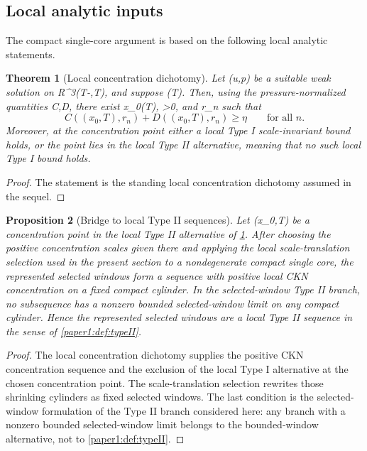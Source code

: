 \documentclass[11pt]{amsart}
\def\({}%
\def\){}%
\def\mathbb#1{#1}%
\theoremstyle{plain}
\newtheorem{theorem}{Theorem}[section]
\newtheorem{proposition}[theorem]{Proposition}
\theoremstyle{definition}
\theoremstyle{remark}
\begin{document}
\subsection{Local analytic inputs}

The compact single-core argument is based on the following local analytic statements.

\begin{theorem}[Local concentration dichotomy]
\label{paper1:thm:paper0-dichotomy}
Let \((u,p)\) be a suitable weak solution on
\(\mathbb R^3\times(T-\delta,T)\), and suppose \(\Sigma(T)\ne\emptyset\).
Then, using the pressure-normalized quantities \(C,D\), there exist
\(x_0\in\Sigma(T)\), \(\eta>0\), and \(r_n\) such that
\[
  C((x_0,T),r_n)+D((x_0,T),r_n)\ge\eta
  \qquad\text{for all }n.
\]
Moreover, at the concentration point either a local Type I scale-invariant
bound holds, or the point lies in the local Type II alternative, meaning that
no such local Type I bound holds.
\end{theorem}

\begin{proof}
The statement is the standing local concentration dichotomy assumed in the sequel.
\end{proof}

\begin{proposition}[Bridge to local Type II sequences]
\label{paper1:prop:paper0-typeII-bridge}
Let \((x_0,T)\) be a concentration point in the local Type II alternative of
\cref{paper1:thm:paper0-dichotomy}.  After choosing the positive concentration scales
given there and applying the local scale-translation selection used in the
present section to a nondegenerate compact single core, the represented selected
windows form a sequence with positive local CKN concentration on a fixed compact
cylinder.  In the selected-window Type II branch, no subsequence has a nonzero
bounded selected-window limit on any compact cylinder.  Hence the represented
selected windows are a local Type II sequence in the sense of \cref{paper1:def:typeII}.
\end{proposition}

\begin{proof}
The local concentration dichotomy supplies the positive CKN concentration sequence and the exclusion of
the local Type I alternative at the chosen concentration point.  The
scale-translation selection rewrites those shrinking cylinders as fixed
selected windows.  The last condition is the selected-window
formulation of the Type II branch considered here: any branch with a nonzero
bounded selected-window limit belongs to the bounded-window alternative,
not to \cref{paper1:def:typeII}.
\end{proof}
\end{document}
